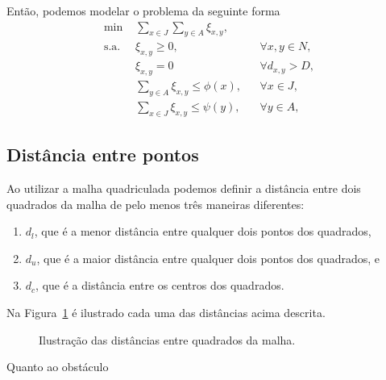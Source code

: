 Então, podemos modelar o problema da seguinte forma
\begin{subequations}
    \begin{align}
        \text{min } & \sum_{x \in J} \sum_{y \in A} \xi_{x,y},
        \label{eq:model_with_obs:obj_func} \\
        \text{s.a. } & \xi_{x,y} \geq 0, && \forall x, y \in N,
        \label{eq:model_with_obs:var} \\
        & \xi_{x,y} = 0 && \forall d_{x,y} > D,
        \label{eq:model_with_obs:max_dist} \\
        & \sum_{y \in A} \xi_{x,y} \leq \phi(x), && \forall x \in J,
        \label{eq:model_with_obs:max_jazida} \\
        & \sum_{x \in J} \xi_{x,y} \leq \psi(y), && \forall y \in A,
        \label{eq:model_with_obs:max_aterro}
    \end{align}
    \label{eq:model_with_obs}
\end{subequations}

\subsection{Distância entre pontos}
Ao utilizar a malha quadriculada podemos definir a dist\^{a}ncia entre dois
quadrados da malha de pelo menos tr\^{e}s maneiras diferentes:
\begin{enumerate}
    \item $d_l$, que \'{e} a menor dist\^{a}ncia entre qualquer dois pontos dos
        quadrados,
    \item $d_u$, que \'{e} a maior dist\^{a}ncia entre qualquer dois pontos dos
        quadrados, e
    \item $d_c$, que \'{e} a dist\^{a}ncia entre os centros dos quadrados.
\end{enumerate}
Na Figura~\ref{fig:dist_malha} \'{e} ilustrado cada uma das dist\^{a}ncias acima
descrita.
\begin{figure}[!htb]
    \centering
    \caption{Ilustra\c{c}\~{a}o das dist\^{a}ncias entre quadrados da malha.}
    \label{fig:dist_malha}
\end{figure}

Quanto ao obst\'{a}culo

